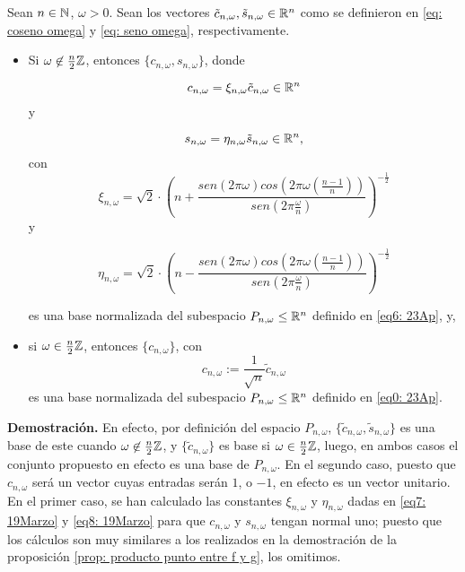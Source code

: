 \begin{prop}
\label{prop: aaa}
Sean $n \in \mathbb{N}$, $\omega>0$. Sean los vectores 
$\tilde{c}_{n, \omega}, 
\tilde{s}_{n ,\omega} \in \mathbb{R}^{n}$ 
como se definieron en 
\eqref{eq: coseno omega} y \eqref{eq: seno omega}, 
respectivamente.
\begin{itemize}
	\item Si $\omega \not\in \frac{n}{2} \mathbb{Z}$, entonces 
	$\{ c_{n, \omega}, s_{n, \omega} \}$, donde

	\begin{equation}
	\label{eq5: 19Marzo}
	c_{n, \omega}=\xi_{n, \omega} \tilde{c}_{n, \omega}
	\in \mathbb{R}^{n}
	\end{equation}
y 

	\begin{equation}
	\label{eq6: 19Marzo}
	s_{n, \omega}= \eta_{n, \omega} \tilde{s}_{n, \omega}
	\in \mathbb{R}^{n},
	\end{equation}
con 
\begin{equation}
\label{eq7: 19Marzo}
	\xi_{n, \omega}= 
	\sqrt{2} \cdot \left( n + \frac{sen(2 \pi \omega)
	cos(2 \pi \omega \left(\frac{n-1}{n} \right))}{sen \left(2 \pi 
	\frac{\omega}{n} \right)} \right)^{-\frac{1}{2}} 
\end{equation}
y

	\begin{equation}
	\label{eq8: 19Marzo}
	\eta_{n, \omega}= \sqrt{2} \cdot \left( n - \frac{sen(2 \pi \omega)
	cos(2 \pi \omega \left(\frac{n-1}{n} \right))}{sen \left(2 \pi 
	\frac{\omega}{n} \right)} \right)^{-\frac{1}{2}}
	\end{equation}

\noindent
es una base normalizada del subespacio $P_{n, \omega} \leq \mathbb{R}^{n}$
definido en \eqref{eq6: 23Ap}, y,
\item si $\omega \in \frac{n}{2} \mathbb{Z}$, entonces 
$\{ c_{n, \omega} \}$, con
\begin{equation}
\label{ec: 4: 23ap}
	c_{n, \omega} := \frac{1}{\sqrt{n}} \tilde{c}_{n, \omega}
\end{equation}
es una base normalizada 
del subespacio $P_{n, \omega} \leq \mathbb{R}^{n}$
definido en \eqref{eq0: 23Ap}.
\end{itemize}
\end{prop}
\noindent
\textbf{Demostración.}
En efecto, por definición del espacio
$P_{n, \omega}$, $\{ \tilde{c}_{n, \omega}, 
\tilde{s}_{n, \omega} \}$
es una base de este cuando
$\omega \not\in \frac{n}{2}\mathbb{Z}$, y
$\{ \tilde{c}_{n, \omega}\}$ es base si 
$\omega \in \frac{n}{2}\mathbb{Z}$,
luego, en ambos casos el conjunto propuesto en efecto
es una base de $P_{n, \omega}$.
En el segundo caso, puesto que
$c_{n, \omega}$ será un vector cuyas entradas serán $1$, o $-1$,
en efecto es un vector unitario. 
En el primer caso, se han calculado las constantes 
$\xi_{n, \omega}$ y $\eta_{n, \omega}$
dadas en 
\eqref{eq7: 19Marzo} y \eqref{eq8: 19Marzo}
para que $c_{n, \omega}$ y $s_{n, \omega}$
tengan normal uno; puesto que los cálculos son muy
similares a los realizados en la demostración de la proposición
\ref{prop: producto punto entre f y g}, los omitimos.
\QEDB
\vspace{0.2cm}


